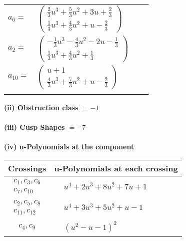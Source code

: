 \documentclass[1p]{elsarticle_modified}
\theoremstyle{definition}
\begin{document}
\begin{tabular}{m{7pt} m{180pt} m{7pt} m{180pt} }
\flushright $a_{6}=$&$\begin{pmatrix}\frac{2}{3} u^3+\frac{5}{3} u^2+3 u+\frac{2}{3}\\\frac{1}{3} u^3+\frac{4}{3} u^2+u-\frac{2}{3}\end{pmatrix}$ \\
\flushright $a_{2}=$&$\begin{pmatrix}-\frac{1}{3} u^3-\frac{4}{3} u^2-2 u-\frac{1}{3}\\\frac{1}{3} u^3+\frac{4}{3} u^2+\frac{1}{3}\end{pmatrix}$ \\
\flushright $a_{10}=$&$\begin{pmatrix}u+1\\\frac{4}{3} u^3+\frac{7}{3} u^2+u-\frac{2}{3}\end{pmatrix}$\\&\end{tabular}
\flushleft \textbf{(ii) Obstruction class $= -1$}\\~\\
\flushleft \textbf{(iii) Cusp Shapes $= -7$}\\~\\
\newpage\renewcommand{\arraystretch}{1}
\flushleft \textbf{(iv) u-Polynomials at the component}\newline \\
\begin{tabular}{m{50pt}|m{274pt}}
Crossings & \hspace{64pt}u-Polynomials at each crossing \\
\hline $$\begin{aligned}c_{1},c_{3},c_{6}\\c_{7},c_{10}\end{aligned}$$&$\begin{aligned}
&u^4+2 u^3+8 u^2+7 u+1
\end{aligned}$\\
\hline $$\begin{aligned}c_{2},c_{5},c_{8}\\c_{11},c_{12}\end{aligned}$$&$\begin{aligned}
&u^4+3 u^3+5 u^2+u-1
\end{aligned}$\\
\hline $$\begin{aligned}c_{4},c_{9}\end{aligned}$$&$\begin{aligned}
&(u^2- u-1)^2
\end{aligned}$\\
\hline
\end{tabular}\\~\\
\end{document}
